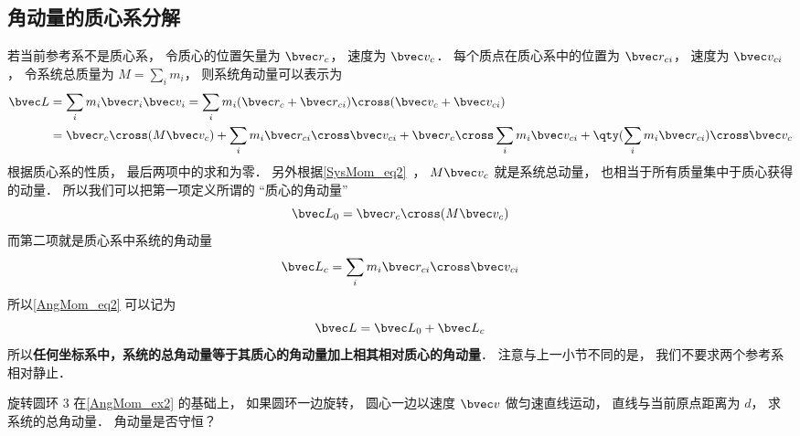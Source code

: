 \subsection{角动量的质心系分解}
若当前参考系不是质心系， 令质心的位置矢量为 $\bvec r_c$， 速度为 $\bvec v_c$． 每个质点在质心系中的位置为 $\bvec r_{ci}$， 速度为 $\bvec v_{ci}$， 令系统总质量为 $M = \sum_i m_i$， 则系统角动量可以表示为
\begin{equation}\label{AngMom_eq2}
\begin{aligned}
\bvec L &= \sum_i m_i \bvec r_i \bvec v_i = \sum_i m_i (\bvec r_c + \bvec r_{ci})\cross( \bvec v_c + \bvec v_{ci})\\
&= \bvec r_c \cross (M\bvec v_c) + \sum_i m_i \bvec r_{ci}\cross \bvec v_{ci} + \bvec r_c \cross \sum_i m_i \bvec v_{ci} + \qty(\sum_i m_i \bvec r_{ci}) \cross \bvec v_c
\end{aligned}
\end{equation}
根据质心系的性质， 最后两项中的求和为零． 另外根据\autoref{SysMom_eq2}~， $M\bvec v_c$ 就是系统总动量， 也相当于所有质量集中于质心获得的动量． 所以我们可以把第一项定义所谓的 “质心的角动量”
\begin{equation}
\bvec L_0 = \bvec r_c \cross (M \bvec v_c)
\end{equation}
而第二项就是质心系中系统的角动量
\begin{equation}
\bvec L_c = \sum_i m_i \bvec r_{ci}\cross \bvec v_{ci}
\end{equation}
所以\autoref{AngMom_eq2} 可以记为
\begin{equation}
\bvec L = \bvec L_0 + \bvec L_c
\end{equation}
所以\textbf{任何坐标系中，系统的总角动量等于其质心的角动量加上相其相对质心的角动量}． 注意与上一小节不同的是， 我们不要求两个参考系相对静止．

\begin{exercise}{旋转圆环 3}
在\autoref{AngMom_ex2} 的基础上， 如果圆环一边旋转， 圆心一边以速度 $\bvec v$ 做匀速直线运动， 直线与当前原点距离为 $d$， 求系统的总角动量． 角动量是否守恒？
\end{exercise}
